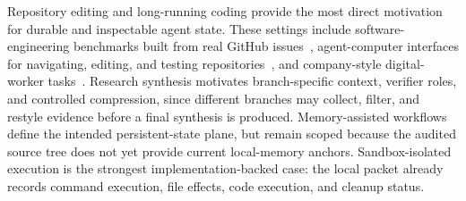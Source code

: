 Repository editing and long-running coding provide the most direct motivation for durable and inspectable agent state. These settings include software-engineering benchmarks built from real GitHub issues~\cite{swebench}, agent-computer interfaces for navigating, editing, and testing repositories~\cite{swe-agent}, and company-style digital-worker tasks~\cite{theagentcompany}. Research synthesis motivates branch-specific context, verifier roles, and controlled compression, since different branches may collect, filter, and restyle evidence before a final synthesis is produced. Memory-assisted workflows define the intended persistent-state plane, but remain scoped because the audited source tree does not yet provide current local-memory anchors. Sandbox-isolated execution is the strongest implementation-backed case: the local packet already records command execution, file effects, code execution, and cleanup status.
